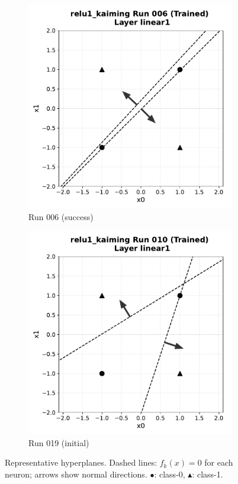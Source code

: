 \begin{figure}[h]
  \centering
  \begin{subfigure}{0.30\textwidth}
    \includegraphics[width=\linewidth]{relu1/figs/success_mirror.pdf}
    \caption{Run 006 (success)}
  \end{subfigure}\hfill
  \begin{subfigure}{0.30\textwidth}
    \includegraphics[width=\linewidth]{relu1/figs/success_no_mirror.pdf}
    \caption{Run 019 (initial)}
  \end{subfigure}\hfill
  \caption{Representative hyperplanes.  Dashed lines: $f_k(x)=0$ for each
           neuron; arrows show normal directions.  \(\bullet\): class-0,
           \(\blacktriangle\): class-1.}
  \label{fig:relu1-kaiming-planes}
\end{figure}

